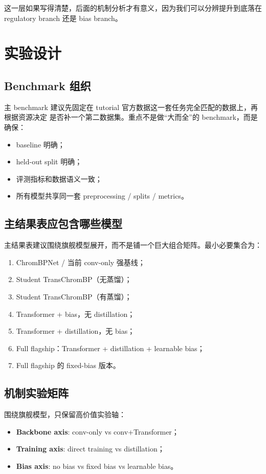 \documentclass[11pt,a4paper]{ctexart}
\begin{document}
这一层如果写得清楚，后面的机制分析才有意义，因为我们可以分辨提升到底落在
regulatory branch 还是 bias branch。

\section{实验设计}

\subsection{Benchmark 组织}
主 benchmark 建议先固定在 tutorial 官方数据这一套任务完全匹配的数据上，再根据资源决定
是否补一个第二数据集。重点不是做“大而全”的 benchmark，而是确保：
\begin{itemize}[leftmargin=2em]
  \item baseline 明确；
  \item held-out split 明确；
  \item 评测指标和数据语义一致；
  \item 所有模型共享同一套 preprocessing / splits / metrics。
\end{itemize}

\subsection{主结果表应包含哪些模型}
主结果表建议围绕旗舰模型展开，而不是铺一个巨大组合矩阵。最小必要集合为：
\begin{enumerate}[leftmargin=2em]
  \item ChromBPNet / 当前 conv-only 强基线；
  \item Student TransChromBP（无蒸馏）；
  \item Student TransChromBP（有蒸馏）；
  \item Transformer + bias，无 distillation；
  \item Transformer + distillation，无 bias；
  \item Full flagship：Transformer + distillation + learnable bias；
  \item Full flagship 的 fixed-bias 版本。
\end{enumerate}

\subsection{机制实验矩阵}
围绕旗舰模型，只保留高价值实验轴：
\begin{itemize}[leftmargin=2em]
  \item \textbf{Backbone axis}: conv-only vs conv+Transformer；
  \item \textbf{Training axis}: direct training vs distillation；
  \item \textbf{Bias axis}: no bias vs fixed bias vs learnable bias。
\end{itemize}
\end{document}
